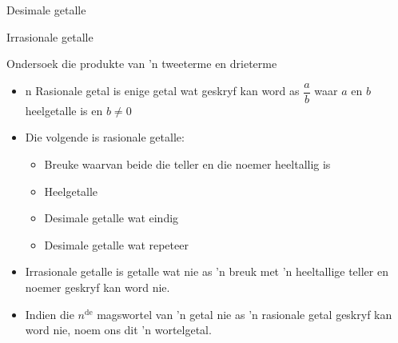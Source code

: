 \begin{Aktiwiteit}{Desimale getalle}
\begin{aktiwiteit}{Irrasionale getalle}
\begin{aktiwiteit}{Ondersoek die produkte van 'n tweeterme en drieterme}
\begin{exercises}{}
{
}
\end{exercises}



\begin{itemize}[itemsep=5pt, label=\textbullet{}]

\item n Rasionale getal is enige getal wat geskryf kan word as $\dfrac{a}{b}$
waar $a$ en $b$ heelgetalle is en $b\ne 0$\item Die volgende is rasionale getalle:
    \begin{itemize}[noitemsep]
	\item Breuke waarvan beide die teller en die noemer heeltallig is
	\item Heelgetalle
	\item Desimale getalle wat eindig
	\item Desimale getalle wat repeteer
    \end{itemize}
\item Irrasionale getalle is getalle wat nie as ’n breuk met ’n heeltallige teller en noemer geskryf kan word nie.
\item Indien die ${n}^{\mathrm{de}}$ magswortel van ’n getal nie as ’n rasionale getal geskryf kan word nie, noem ons dit ’n wortelgetal.

\end{itemize}
\end{aktiwiteit}
\end{aktiwiteit}
\end{Aktiwiteit}
